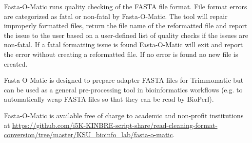 Fasta-O-Matic runs quality checking of the FASTA file format. File format errors are categorized as fatal or non-fatal by Fasta-O-Matic. The tool will repair improperly formatted files, return the file name of the reformatted file and report the issue to the user based on a user-defined list of quality checks if the issues are non-fatal. If a fatal formatting issue is found Fasta-O-Matic will exit and report the error without creating a reformatted file. If no error is found no new file is created.

Fasta-O-Matic is designed to prepare adapter FASTA files for Trimmomatic but can be used as a general pre-processing tool in bioinformatics workflows (e.g. to automatically wrap FASTA files so that they can be read by BioPerl).

Fasta-O-Matic is available free of charge to academic and non-profit institutions at \url{https://github.com/i5K-KINBRE-script-share/read-cleaning-format-conversion/tree/master/KSU\_bioinfo\_lab/fasta-o-matic}.
  
  
  